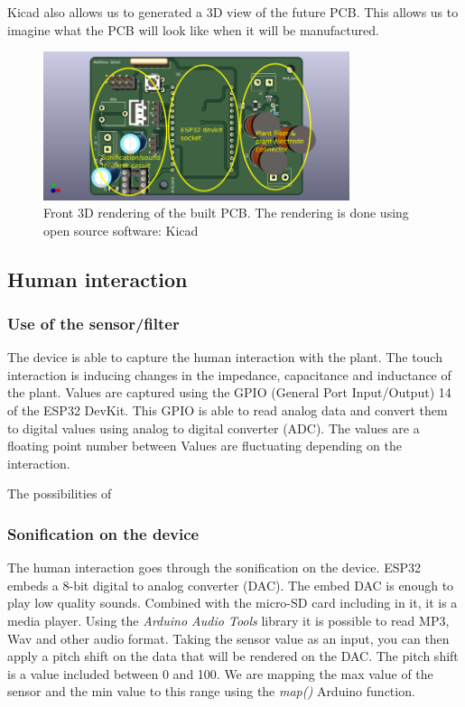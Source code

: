 Kicad also allows us to generated a 3D view of the future PCB. This allows us to imagine what the
PCB will look like when it will be manufactured.
\begin{figure}[H]
    \centering
    \includegraphics[width=0.8\textwidth]{images/front_iop_3D_view_modified.png}
    \caption{Front 3D rendering of the built PCB. The rendering is done using open source software: Kicad} 
    \vspace{0.1cm}
    \label{fig:front_iop_3D_view_modified}
\end{figure}

\subsection{Human interaction}

\subsubsection{Use of the sensor/filter}

The device is able to capture the human interaction with the plant. The touch interaction is inducing changes
in the impedance, capacitance and inductance of the plant. Values are captured using the GPIO (General Port Input/Output)
14 of the ESP32 DevKit. This GPIO is able to read analog data and convert them to digital values using analog to digital
converter (ADC). The values are a floating point number between %
Values are fluctuating depending on the interaction. 


The possibilities of 


\subsubsection{Sonification on the device} %

The human interaction goes through the sonification on the device. ESP32 embeds a 8-bit digital to analog converter (DAC).
The embed DAC is enough to play low quality sounds. Combined with the micro-SD card including in it, it is a media player.
Using the \textit{Arduino Audio Tools} library it is possible to read MP3, Wav and other audio format.
Taking the sensor value as an input, you can then apply a pitch shift on the data that will be rendered on the DAC.
The pitch shift is a value included between 0 and 100. We are mapping the max value of the sensor and the min value
to this range using the \textit{map()} Arduino function.

